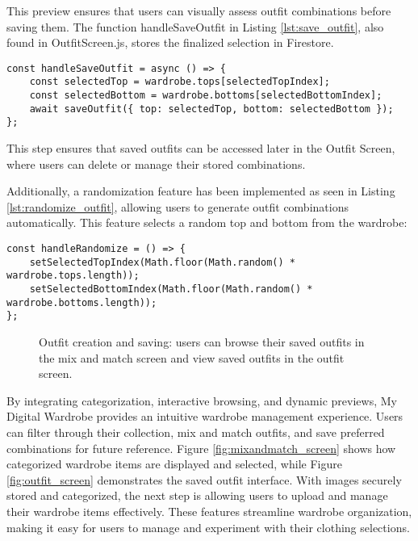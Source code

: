 This preview ensures that users can visually assess outfit combinations before saving them. The function handleSaveOutfit in Listing \ref{lst:save_outfit}, also found in OutfitScreen.js, stores the finalized selection in Firestore.

\begin{lstlisting}[caption={Save outfit function}, label={lst:save_outfit}]
const handleSaveOutfit = async () => {
    const selectedTop = wardrobe.tops[selectedTopIndex];
    const selectedBottom = wardrobe.bottoms[selectedBottomIndex];
    await saveOutfit({ top: selectedTop, bottom: selectedBottom });
};
\end{lstlisting}

This step ensures that saved outfits can be accessed later in the Outfit Screen, where users can delete or manage their stored combinations.

Additionally, a randomization feature has been implemented as seen in Listing \ref{lst:randomize_outfit}, allowing users to generate outfit combinations automatically. This feature selects a random top and bottom from the wardrobe:

\begin{lstlisting}[caption={Randomize outfit function}, label={lst:randomize_outfit}] 
const handleRandomize = () => {
    setSelectedTopIndex(Math.floor(Math.random() * wardrobe.tops.length));
    setSelectedBottomIndex(Math.floor(Math.random() * wardrobe.bottoms.length));
};
\end{lstlisting}

\begin{figure}[!ht]
    \centering
    \qquad %
    \caption{Outfit creation and saving: users can browse their saved outfits in the mix and match screen and view saved outfits in the outfit screen.}
    \label{fig:wardrobe_outfit_flow}
\end{figure}

By integrating categorization, interactive browsing, and dynamic previews, My Digital Wardrobe provides an intuitive wardrobe management experience. Users can filter through their collection, mix and match outfits, and save preferred combinations for future reference. Figure \ref{fig:mixandmatch_screen} shows how categorized wardrobe items are displayed and selected, while Figure \ref{fig:outfit_screen} demonstrates the saved outfit interface.
With images securely stored and categorized, the next step is allowing users to upload and manage their wardrobe items effectively. 
These features streamline wardrobe organization, making it easy for users to manage and experiment with their clothing selections.

